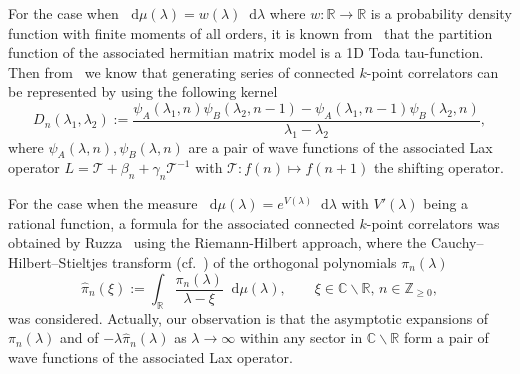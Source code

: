 \documentclass[a4paper]{article}
\theoremstyle{plain}
\theoremstyle{definition}
\newcommand{\dif}{\mathop{}\!\mathrm{d}}
\newcommand{\ZZ}{\mathbb{Z}}
\newcommand{\RR}{\mathbb{R}}
\newcommand{\CC}{\mathbb{C}}
\begin{document}
For the case when $\dif\mu(\lambda)=w(\lambda)\dif\lambda$ where $w:\RR\to\RR$ is a probability density function with finite moments of all orders, it is known from~\cite{GMO,Martinec,AvM,DY,Toda,Yin,YGueI} that the partition function of the associated hermitian matrix model is a 1D Toda tau-function. Then from~\cite{DY,Toda} we know that generating series of connected $k$-point correlators can be represented by using the following kernel
\begin{equation} \label{dn}
	D_n(\lambda_1,\lambda_2):=\frac{\psi_A(\lambda_1,n)\psi_B(\lambda_2,n-1)-\psi_A(\lambda_1,n-1)\psi_B(\lambda_2,n)}{\lambda_1-\lambda_2},
\end{equation}
where $\psi_A(\lambda,n),\psi_B(\lambda,n)$ are a pair of wave functions of the associated Lax operator $L=\mathcal T+\beta_n+\gamma_n\mathcal T^{-1}$ with $\mathcal T:f(n)\mapsto f(n+1)$ the shifting operator.

For the case when the measure $\dif\mu(\lambda)=e^{V(\lambda)}\dif\lambda$ with $V'(\lambda)$ being a rational function, a formula for the associated connected $k$-point correlators was obtained by Ruzza~\cite{Ruzza} using the Riemann-Hilbert approach, where the Cauchy--Hilbert--Stieltjes transform (cf.~\cite{Deift,Bergere,BE,Ruzza}) of the orthogonal polynomials $\pi_n(\lambda)$
	\begin{equation} \label{chs}
		\widehat{\pi}_n(\xi):=\int_\RR\frac{\pi_n(\lambda)}{\lambda-\xi}\dif\mu(\lambda),\qquad\xi\in\CC\backslash\RR, \, n\in\ZZ_{\ge0},
	\end{equation}
	was considered. Actually, our observation is that the asymptotic expansions of $\pi_n(\lambda)$ and of $-\lambda\widehat\pi_n(\lambda)$ as $\lambda\to\infty$ within any sector in $\CC\backslash\RR$ form a pair of wave functions of the associated Lax operator.
\end{document}
